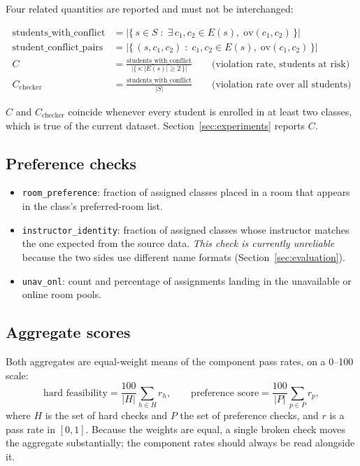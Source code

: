 Four related quantities are reported and must not be interchanged:

\begin{align*}
  \text{students\_with\_conflict} &= \bigl|\{\, s \in S \;:\; \exists\, c_1,c_2 \in E(s),\;
      \mathrm{ov}(c_1,c_2) \,\}\bigr| \\[2pt]
  \text{student\_conflict\_pairs} &= \bigl|\{\, (s,c_1,c_2) \;:\; c_1,c_2 \in E(s),\;
      \mathrm{ov}(c_1,c_2) \,\}\bigr| \\[2pt]
  C &= \frac{\text{students\_with\_conflict}}{\bigl|\{\, s : |E(s)| \ge 2 \,\}\bigr|}
      \qquad\text{(violation rate, students at risk)} \\[2pt]
  C_{\mathrm{checker}} &= \frac{\text{students\_with\_conflict}}{|S|}
      \qquad\text{(violation rate over all students)}
\end{align*}

$C$ and $C_{\mathrm{checker}}$ coincide whenever every student is enrolled in at least two classes,
which is true of the current dataset. Section~\ref{sec:experiments} reports $C$.

\subsection{Preference checks}

\begin{itemize}
  \item \texttt{room\_preference}: fraction of assigned classes placed in a room that appears in
    the class's preferred-room list.
  \item \texttt{instructor\_identity}: fraction of assigned classes whose instructor matches the
    one expected from the source data. \emph{This check is currently unreliable} because the two
    sides use different name formats (Section~\ref{sec:evaluation}).
  \item \texttt{unav\_onl}: count and percentage of assignments landing in the unavailable or
    online room pools.
\end{itemize}

\subsection{Aggregate scores}

Both aggregates are equal-weight means of the component pass rates, on a 0--100 scale:
\[
  \text{hard feasibility} = \frac{100}{|H|}\sum_{h \in H} r_h ,
  \qquad
  \text{preference score} = \frac{100}{|P|}\sum_{p \in P} r_p ,
\]
where $H$ is the set of hard checks and $P$ the set of preference checks, and $r$ is a pass rate in
$[0,1]$. Because the weights are equal, a single broken check moves the aggregate substantially;
the component rates should always be read alongside it.

